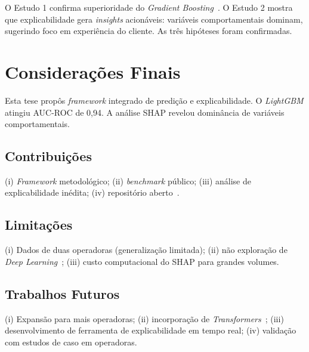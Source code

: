 \documentclass[
    12pt,
    oneside,
    a4paper,
    english,
    brazilian
    ]{abntex2}
\numberwithin{equation}{chapter}
\begin{document}
O Estudo 1 confirma superioridade do \textit{Gradient Boosting}~\cite{hastie2009}. O Estudo 2 mostra que explicabilidade gera \textit{insights} acionáveis: variáveis comportamentais dominam, sugerindo foco em experiência do cliente. As três hipóteses foram confirmadas.

\chapter{Considerações Finais}

Esta tese propôs \textit{framework} integrado de predição e explicabilidade. O \textit{LightGBM} atingiu AUC-ROC de 0,94. A análise SHAP revelou dominância de variáveis comportamentais.

\section{Contribuições}

(i) \textit{Framework} metodológico; (ii) \textit{benchmark} público; (iii) análise de explicabilidade inédita; (iv) repositório aberto~\cite{moresi2023}.

\section{Limitações}

(i) Dados de duas operadoras (generalização limitada); (ii) não exploração de \textit{Deep Learning}~\cite{goodfellow2016}; (iii) custo computacional do SHAP para grandes volumes.

\section{Trabalhos Futuros}

(i) Expansão para mais operadoras; (ii) incorporação de \textit{Transformers}~\cite{vaswani2017}; (iii) desenvolvimento de ferramenta de explicabilidade em tempo real; (iv) validação com estudos de caso em operadoras.

\newpage
{}
{}
\printindex

\newpage
\appendix
\end{document}
